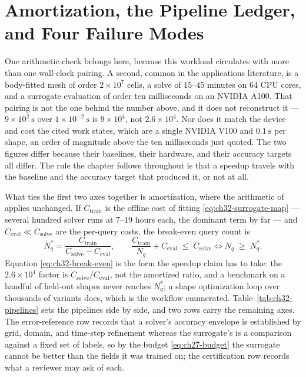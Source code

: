 \section{Amortization, the Pipeline Ledger, and Four Failure Modes}
\label{sec:ch32-ledger}

One arithmetic check belongs here, because this workload circulates with more than one wall-clock
pairing. A second, common in the applications literature, is a body-fitted mesh of order
$2\times10^{7}$ cells, a solve of $15$--$45$ minutes on 64 CPU cores, and a surrogate
evaluation of order ten milliseconds on an NVIDIA A100. That pairing is not the one behind the
number above, and it does not reconstruct it --- $9\times10^{2}\ \mathrm{s}$ over
$1\times10^{-2}\ \mathrm{s}$ is $9\times10^{4}$, not $2.6\times10^{4}$. Nor does it match the
device and cost the cited work states, which are a single NVIDIA V100 and $0.1\ \mathrm{s}$ per
shape, an order of magnitude above the ten milliseconds just quoted. The two figures differ because
their baselines, their hardware, and their accuracy targets all differ.
The rule the chapter follows throughout is that a
speedup travels with the baseline and the accuracy target that produced it, or not at
all.

What ties the first two axes together is amortization, where the arithmetic of
 applies unchanged. If
$C_{\text{train}}$ is the offline cost of fitting
\eqref{eq:ch32-surrogate-map} --- several hundred solver runs at 7--19 hours each, the dominant
term by far --- and $C_{\text{eval}} \ll C_{\text{solve}}$ are the per-query costs, the
break-even query count is
\begin{equation}
  \label{eq:ch32-break-even}
  N_q^{*} = \frac{C_{\text{train}}}{C_{\text{solve}} - C_{\text{eval}}},
  \qquad
  \frac{C_{\text{train}}}{N_q} + C_{\text{eval}} \;\le\; C_{\text{solve}} \iff N_q \;\ge\; N_q^{*}.
\end{equation}
Equation \eqref{eq:ch32-break-even} is the form the speedup claim has to take: the
$2.6\times10^{4}$ factor is $C_{\text{solve}}/C_{\text{eval}}$, not the amortized ratio, and a
benchmark on a handful of held-out shapes never reaches $N_q^{*}$; a shape optimization loop over
thousands of variants
does, which is the workflow 
enumerated.
Table~\ref{tab:ch32-pipelines} sets the pipelines side by side, and two rows carry the remaining
axes. The error-reference row records that a solver's accuracy envelope is established by grid,
domain, and time-step refinement whereas the surrogate's is a comparison against a fixed set of
labels, so by the budget \eqref{eq:ch27-budget} the surrogate cannot be better than the fields it
was trained on; the certification row records what a reviewer may ask of each.

